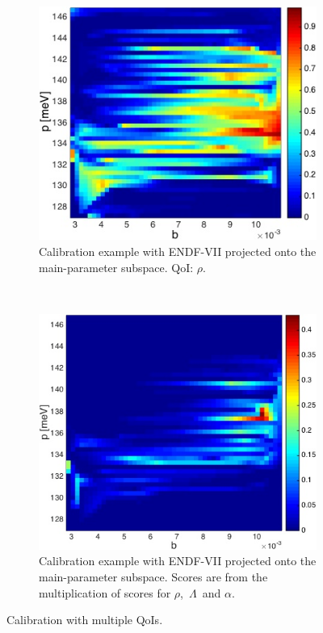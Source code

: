 \documentclass[review]{elsarticle}
\begin{document}
\begin{figure}[ht!]
\begin{subfigure}{0.5\textwidth}
\centering
\hspace*{-1.5cm}
\includegraphics[width=1.2\linewidth]{NSE15-48R1_Figure6a.jpg}
\caption{Calibration example with ENDF-VII projected onto the main-parameter subspace. QoI: $\rho$.}
\label{fg:narrow}
\end{subfigure}
~
\begin{subfigure}{0.5\textwidth}
\centering
\vspace*{.7cm}\includegraphics[width=1.2\linewidth]{NSE15-48R1_Figure6b.jpg}
\caption{Calibration example with ENDF-VII projected onto the main-parameter subspace. Scores are from the multiplication of scores for $\rho$,~$\Lambda$~and $\alpha$.}
\label{fg:narrow3}
\end{subfigure}
\caption{Calibration with multiple QoIs.}
\label{fig:cb}
\end{figure}
\end{document}
